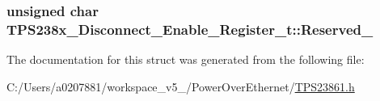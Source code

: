 \hypertarget{struct_t_p_s238x___disconnect___enable___register__t_abd30572716b76b8927166a524bd9e999}{
\subsubsection[{Reserved\-\_\-3}]{\setlength{\rightskip}{0pt plus 5cm}unsigned char T\-P\-S238x\-\_\-\-Disconnect\-\_\-\-Enable\-\_\-\-Register\-\_\-t\-::\-Reserved\-\_}}\label{struct_t_p_s238x___disconnect___enable___register__t_abd30572716b76b8927166a524bd9e999}


The documentation for this struct was generated from the following file\-:\begin{DoxyCompactItemize}
\item 
C\-:/\-Users/a0207881/workspace\-\_\-v5\-\_/\-Power\-Over\-Ethernet/\hyperlink{_t_p_s23861_8h}{T\-P\-S23861.\-h}\end{DoxyCompactItemize}
